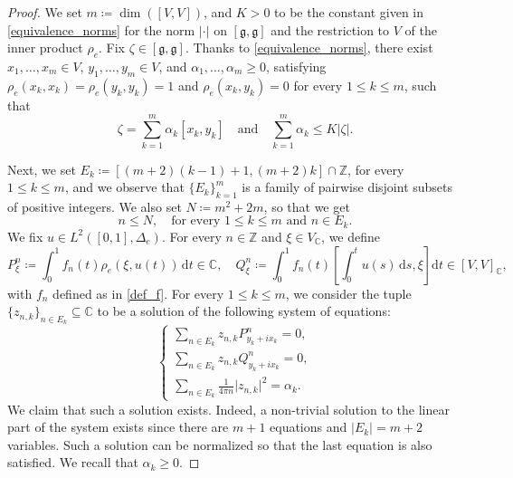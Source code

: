 \documentclass[a4paper,11pt,reqno]{amsart}
\theoremstyle{plain}
\theoremstyle{definition}
\newcommand{\Z}{\mathbb Z}
\newcommand{\C}{\mathbb C}
\newcommand{\g}{\mathfrak{g}}
\newcommand{\id}{e}
\newcommand{\de}{\mathrm{d}}
\newcommand{\coloneq}{\coloneqq}
\begin{document}
\begin{proof}
We set $m \coloneq \dim([V,V])$, and $K > 0$ to be the constant given in \cref{equivalence_norms} for the norm $\lvert \cdot \rvert$ on $[\g,\g]$ and the restriction to $V$ of the inner product $\rho_\id$. Fix $\zeta \in [\g,\g]$. Thanks to \cref{equivalence_norms}, there exist $x_1,\dots,x_{m} \in V$, $y_1,\dots,y_{m} \in V$, and $\alpha_1,\dots,\alpha_{m} \ge 0$, satisfying $\rho_\id(x_k,x_k)=\rho_\id(y_k,y_k)=1$ and $\rho_\id(x_k,y_k)=0$ for every $1 \le k \le m$, such that
\begin{equation} \label{zeta_brakets}
 \zeta = \sum_{k=1}^{m} \alpha_k[x_k,y_k] \quad \text{and} \quad \sum_{k=1}^{m} \alpha_k \le K \lvert \zeta \rvert.
\end{equation}

	Next, we set $E_k \coloneq [(m+2)(k-1)+1, (m+2)k] \cap \Z$, for every $1 \le k \le m$,	and we observe that $\{E_k\}_{k=1}^{m}$ is a family of pairwise disjoint subsets of positive integers. We also set $N \coloneq m^2 + 2m$, so that we get
	\begin{equation} \label{bound_N}
		n \le N, \quad \text{for every $1 \le k \le m$ and $n \in E_k$.}
	\end{equation}
We fix $u \in L^2([0,1],\Delta_\id)$. For every $n \in \Z$ and $\xi \in V_\C$, we define
	\begin{equation*}
		P^n_\xi \coloneq \int^1_0 f_n(t) \rho_\id(\xi,u(t)) \, \de t \in \mathbb{C}, \quad Q^n_\xi \coloneq \int^1_0 f_n(t) \left[ \int^t_0 u(s) \, \de s , \xi \right] \de t \in [V,V]_\mathbb{C},
	\end{equation*}
	with $f_n$ defined as in \eqref{def_f}. For every $1 \le k \le m$, we consider the tuple $\{z_{n,k}\}_{n \in E_k} \subseteq \mathbb{C}$ to be a solution of the following system of equations:
	\begin{equation} \label{system_c}
		\begin{cases}
			\sum_{n \in E_k} z_{n,k}P^n_{y_k + ix_k} = 0, \\
			\sum_{n \in E_k} z_{n,k}Q^n_{y_k + ix_k} = 0, \\
			\sum_{n \in E_k} \tfrac{1}{4 \pi n} \lvert z_{n,k} \rvert^2 = \alpha_k.
		\end{cases}
	\end{equation}
	We claim that such a solution exists. Indeed, a non-trivial solution to the linear part of the system exists since there are $m + 1$ equations and $\lvert E_k \rvert = m + 2$ variables. Such a solution can be normalized so that the last equation is also satisfied. We recall that $\alpha_k \ge 0$.


\end{proof}
\end{document}
